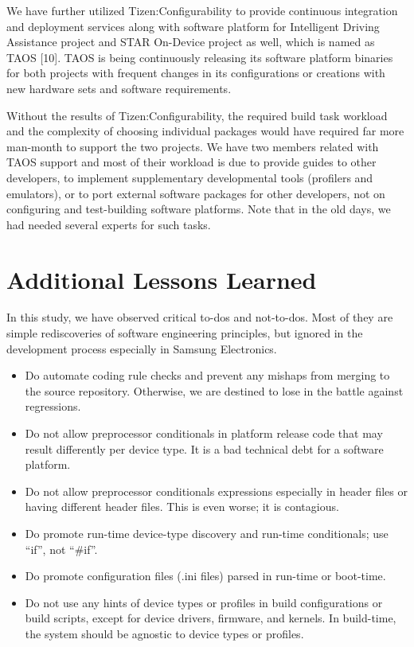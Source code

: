We have further utilized Tizen:Configurability to provide continuous integration and deployment services along with software platform for Intelligent Driving Assistance project and STAR On-Device project as well, which is named as TAOS [10]. TAOS is being continuously releasing its software platform binaries for both projects with frequent changes in its configurations or creations with new hardware sets and software requirements.


Without the results of Tizen:Configurability, the required build task workload and the complexity of choosing individual packages would have required far more man-month to support the two projects. We have two members related with TAOS support and most of their workload is due to provide guides to other developers, to implement supplementary developmental tools (profilers and emulators), or to port external software packages for other developers, not on configuring and test-building software platforms. Note that in the old days, we had needed several experts for such tasks.


\section{Additional Lessons Learned}

In this study, we have observed critical to-dos and not-to-dos. Most of they are simple rediscoveries of software engineering principles, but ignored in the development process especially in Samsung Electronics. 

\begin{itemize}
\item	Do automate coding rule checks and prevent any mishaps from merging to the source repository. Otherwise, we are destined to lose in the battle against regressions.
\item	Do not allow preprocessor conditionals in platform release code that may result differently per device type. It is a bad technical debt for a software platform.
\item	Do not allow preprocessor conditionals expressions especially in header files or having different header files. This is even worse; it is contagious.
\item	Do promote run-time device-type discovery and run-time conditionals; use “if”, not “\#if”.
\item	Do promote configuration files (.ini files) parsed in run-time or boot-time.
\item	Do not use any hints of device types or profiles in build configurations or build scripts, except for device drivers, firmware, and kernels. In build-time, the system should be agnostic to device types or profiles.
\end{itemize}

